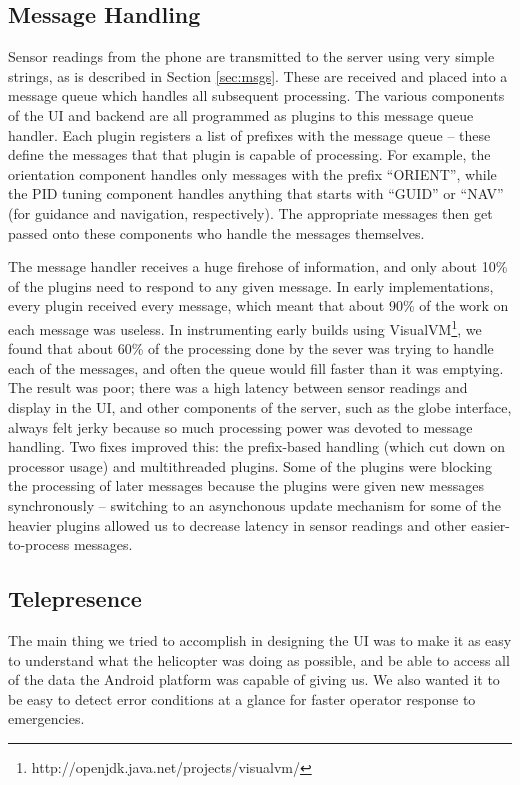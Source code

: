 \subsection{Message Handling}
Sensor readings from the phone are transmitted to the server using
very simple strings, as is described in Section \ref{sec:msgs}. These
are received and placed into a message queue which handles all
subsequent processing. The various components of the UI and backend
are all programmed as plugins to this message queue handler. Each
plugin registers a list of prefixes with the message queue -- these
define the messages that that plugin is capable of processing. For
example, the orientation component handles only messages with the
prefix ``ORIENT'', while the PID tuning component handles anything
that starts with ``GUID'' or ``NAV'' (for guidance and navigation,
respectively). The appropriate messages then get passed onto these
components who handle the messages themselves.

The message handler receives a huge firehose of information, and only
about 10\% of the plugins need to respond to any given message. In
early implementations, every plugin received every message, which
meant that about 90\% of the work on each message was useless. In
instrumenting early builds using
VisualVM\footnote{http://openjdk.java.net/projects/visualvm/}, we
found that about 60\% of the processing done by the sever was trying
to handle each of the messages, and often the queue would fill faster
than it was emptying. The result was poor; there was a high latency
between sensor readings and display in the UI, and other components of
the server, such as the globe interface, always felt jerky because so
much processing power was devoted to message handling. Two fixes
improved this: the prefix-based handling (which cut down on processor
usage) and multithreaded plugins. Some of the plugins were blocking
the processing of later messages because the plugins were given new
messages synchronously -- switching to an asynchonous update mechanism
for some of the heavier plugins allowed us to decrease latency in
sensor readings and other easier-to-process messages.

\subsection{Telepresence}
The main thing we tried to accomplish in designing the UI was to make
it as easy to understand what the helicopter was doing as possible,
and be able to access all of the data the Android platform was capable
of giving us. We also wanted it to be easy to detect error conditions
at a glance for faster operator response to emergencies.

